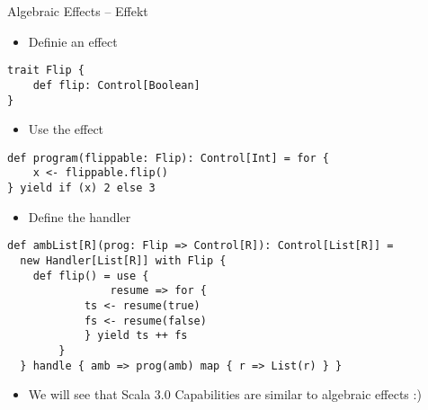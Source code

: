 \documentclass[presentation, 10pt]{beamer}\mode<presentation>{\usetheme{metropolis}}
\begin{document}
\begin{frame}[fragile, shrink=40]{Algebraic Effects -- Effekt}
	\begin{itemize}
		\item Definie an effect
	\end{itemize}
\begin{tcolorbox}
\begin{verbatim}
trait Flip {
	def flip: Control[Boolean]
}
\end{verbatim}
\end{tcolorbox}
\begin{itemize}
	\item Use the effect
\end{itemize}
\begin{tcolorbox}
\begin{verbatim}
def program(flippable: Flip): Control[Int] = for {
	x <- flippable.flip()
} yield if (x) 2 else 3
\end{verbatim}
\end{tcolorbox}
\begin{itemize}
	\item Define the handler
\end{itemize}
\begin{tcolorbox}
\begin{verbatim}
def ambList[R](prog: Flip => Control[R]): Control[List[R]] =
  new Handler[List[R]] with Flip {
    def flip() = use { 
				resume => for {
      		ts <- resume(true)
      		fs <- resume(false)
    		} yield ts ++ fs 
		}
  } handle { amb => prog(amb) map { r => List(r) } }
\end{verbatim}
\end{tcolorbox}
\begin{itemize}
	\item We will see that Scala 3.0 Capabilities are similar to algebraic effects :)
\end{itemize}
\end{frame}
\end{document}
